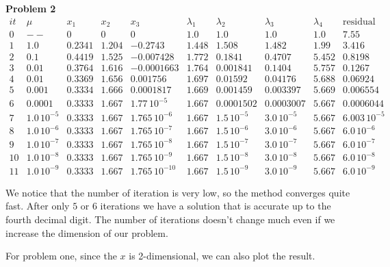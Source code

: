 \documentclass{article}
\begin{document}
\medskip 
\textbf{Problem 2}
\[
\begin{array}{cccccccccc} 
it & \mu & x_1 & x_2 & x_3 & \lambda_1 & \lambda_2 & \lambda_3 & \lambda_4 & \text{residual}\\
\hline
0 & -- & 0 & 0 & 0 & 1.0 & 1.0 & 1.0 & 1.0 & 7.55\\ 1 & 1.0 & 0.2341 & 1.204 & -0.2743 & 1.448 & 1.508 & 1.482 & 1.99 & 3.416\\ 2 & 0.1 & 0.4419 & 1.525 & -0.007428 & 1.772 & 0.1841 & 0.4707 & 5.452 & 0.8198\\ 3 & 0.01 & 0.3764 & 1.616 & -0.0001663 & 1.764 & 0.001841 & 0.1404 & 5.757 & 0.1267\\ 4 & 0.01 & 0.3369 & 1.656 & 0.001756 & 1.697 & 0.01592 & 0.04176 & 5.688 & 0.06924\\ 5 & 0.001 & 0.3334 & 1.666 & 0.0001817 & 1.669 & 0.001459 & 0.003397 & 5.669 & 0.006554\\ 6 & 0.0001 & 0.3333 & 1.667 & 1.77\,{10}^{-5} & 1.667 & 0.0001502 & 0.0003007 & 5.667 & 0.0006044\\ 7 & 1.0\,{10}^{-5} & 0.3333 & 1.667 & 1.765\,{10}^{-6} & 1.667 & 1.5\,{10}^{-5} & 3.0\,{10}^{-5} & 5.667 & 6.003\,{10}^{-5}\\ 8 & 1.0\,{10}^{-6} & 0.3333 & 1.667 & 1.765\,{10}^{-7} & 1.667 & 1.5\,{10}^{-6} & 3.0\,{10}^{-6} & 5.667 & 6.0\,{10}^{-6}\\ 9 & 1.0\,{10}^{-7} & 0.3333 & 1.667 & 1.765\,{10}^{-8} & 1.667 & 1.5\,{10}^{-7} & 3.0\,{10}^{-7} & 5.667 & 6.0\,{10}^{-7}\\ 10 & 1.0\,{10}^{-8} & 0.3333 & 1.667 & 1.765\,{10}^{-9} & 1.667 & 1.5\,{10}^{-8} & 3.0\,{10}^{-8} & 5.667 & 6.0\,{10}^{-8}\\ 11 & 1.0\,{10}^{-9} & 0.3333 & 1.667 & 1.765\,{10}^{-10} & 1.667 & 1.5\,{10}^{-9} & 3.0\,{10}^{-9} & 5.667 & 6.0\,{10}^{-9} \end{array}
\]

We notice that the number of iteration is very low, so the method converges quite fast. After only $5$ or $6$ iterations we have a solution that is accurate up to the fourth decimal digit. The number of iterations doesn't change much even if we increase the dimension of our problem.

For problem one, since the $x$ is 2-dimensional, we can also plot the result.
\end{document}
